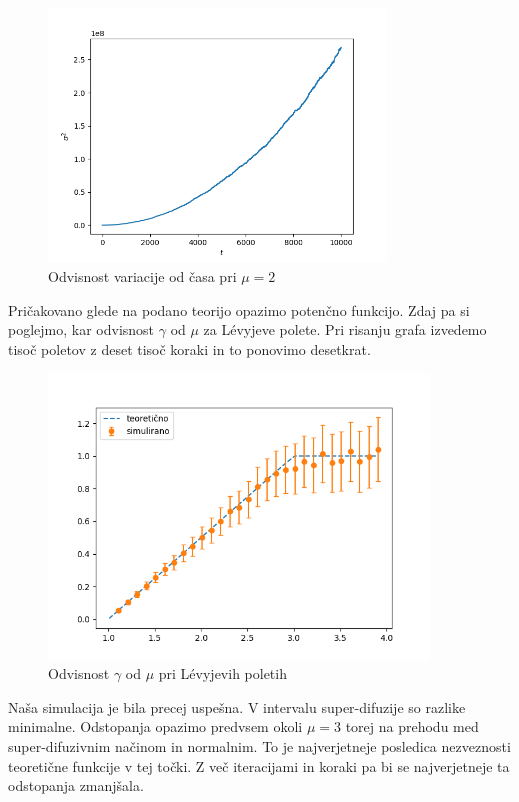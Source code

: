 \documentclass{article}
\begin{document}
\begin{figure}[H]
  \centering
  \includegraphics[width=0.8\textwidth]{vartimemu2.png} 
  \caption{Odvisnost variacije od časa pri $\mu=2$}
\end{figure}
Pričakovano glede na podano teorijo opazimo potenčno funkcijo. 
Zdaj pa si poglejmo, kar odvisnost $\gamma$ od $\mu$ za L\'evyjeve polete. Pri risanju grafa izvedemo tisoč poletov z deset tisoč koraki in to ponovimo desetkrat. 
\begin{figure}[H]
  \centering
  \includegraphics[width=0.9\textwidth]{gammamuflights.png} 
  \caption{Odvisnost $\gamma$ od $\mu$ pri L\'evyjevih poletih}
\end{figure}
Naša simulacija je bila precej uspešna. V intervalu super-difuzije so razlike minimalne. Odstopanja opazimo predvsem okoli $\mu=3$ torej na prehodu med super-difuzivnim načinom in normalnim. To je najverjetneje posledica nezveznosti teoretične funkcije v tej točki. Z več iteracijami in koraki pa bi se najverjetneje ta odstopanja zmanjšala.\\
\end{document}
